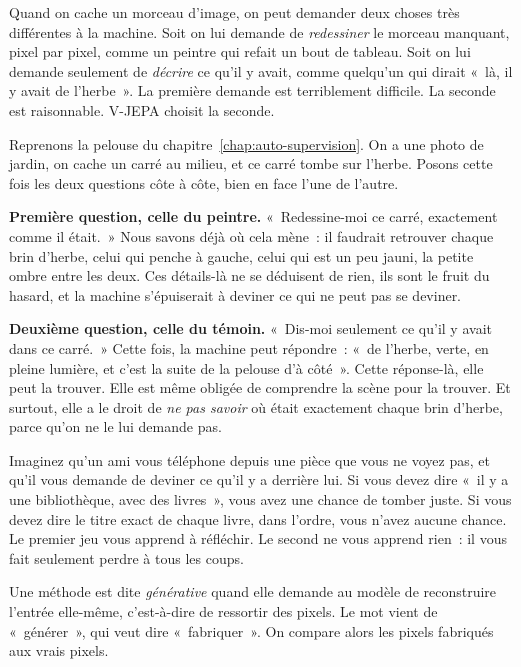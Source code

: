 \begin{enclair}
Quand on cache un morceau d'image, on peut demander deux choses très
différentes à la machine. Soit on lui demande de \emph{redessiner} le
morceau manquant, pixel par pixel, comme un peintre qui refait un bout de
tableau. Soit on lui demande seulement de \emph{décrire} ce qu'il y avait,
comme quelqu'un qui dirait «~là, il y avait de l'herbe~». La première
demande est terriblement difficile. La seconde est raisonnable. V-JEPA
choisit la seconde.
\end{enclair}

Reprenons la pelouse du chapitre~\ref{chap:auto-supervision}. On a une photo
de jardin, on cache un carré au milieu, et ce carré tombe sur l'herbe.
Posons cette fois les deux questions côte à côte, bien en face l'une de
l'autre.

\textbf{Première question, celle du peintre.} «~Redessine-moi ce carré,
exactement comme il était.~» Nous savons déjà où cela mène~: il faudrait
retrouver chaque brin d'herbe, celui qui penche à gauche, celui qui est un
peu jauni, la petite ombre entre les deux. Ces détails-là ne se déduisent de
rien, ils sont le fruit du hasard, et la machine s'épuiserait à deviner ce
qui ne peut pas se deviner.

\textbf{Deuxième question, celle du témoin.} «~Dis-moi seulement ce qu'il y
avait dans ce carré.~» Cette fois, la machine peut répondre~: «~de l'herbe, verte, en
pleine lumière, et c'est la suite de la pelouse d'à côté~». Cette réponse-là,
elle peut la trouver. Elle est même obligée de comprendre la scène pour la
trouver. Et surtout, elle a le droit de \emph{ne pas savoir} où était
exactement chaque brin d'herbe, parce qu'on ne le lui demande pas.

\begin{intuition}
Imaginez qu'un ami vous téléphone depuis une pièce que vous ne voyez pas, et
qu'il vous demande de deviner ce qu'il y a derrière lui. Si vous devez dire
«~il y a une bibliothèque, avec des livres~», vous avez une chance de tomber
juste. Si vous devez dire le titre exact de chaque livre, dans l'ordre, vous
n'avez aucune chance. Le premier jeu vous apprend à réfléchir. Le second
ne vous apprend rien~: il vous fait seulement perdre à tous les coups.
\end{intuition}

\begin{definition}
Une méthode est dite \emph{générative} quand elle demande au modèle de
reconstruire l'entrée elle-même, c'est-à-dire de ressortir des pixels. Le
mot vient de «~générer~», qui veut dire «~fabriquer~». On compare alors les
pixels fabriqués aux vrais pixels.
\end{definition}


